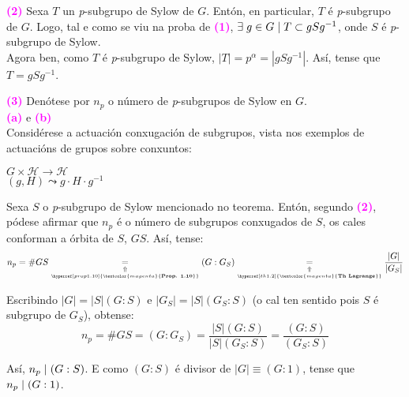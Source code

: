 \documentclass[twoside]{report}
\newcommand{\magbf}[1]{\textcolor{magenta}{\textbf{#1}}} %
\theoremstyle{mystyle}
\begin{document}
\vspace{5mm}

\noindent \magbf{(2)} Sexa $T$ un \textit{p}-subgrupo de Sylow de $G$. Entón, en particular, $T$ é \textit{p}-subgrupo de $G$. Logo, tal e como se viu na proba de \magbf{(1)}, $\exists \hspace{1mm} g \in G \hspace{1mm} | \hspace{1mm} T \subset gSg^{-1}$, onde $S$ é \textit{p}-subgrupo de Sylow.\\

\noindent Agora ben, como $T$ é \textit{p}-subgrupo de Sylow, $|T| = p^{\alpha} = |gSg^{-1}|$. Así, tense que $T = gSg^{-1}$.\\

\vspace{5mm}

\noindent \magbf{(3)} Denótese por $n_{p}$ o número de \textit{p}-subgrupos de Sylow en $G$.\\

\noindent \magbf{(a)} e \magbf{(b)}\\

\noindent Considérese a actuación conxugación de subgrupos, vista nos exemplos de actuacións de grupos sobre conxuntos:

    \begin{center}
    $G \times \mathscr{H} \longrightarrow \mathscr{H}$ \\
    \vspace{2mm}
    \hspace{8mm} $(g,H) \leadsto g \cdot H \cdot g^{-1}$
    \end{center}  
    
\noindent Sexa $S$ o \textit{p}-subgrupo de Sylow mencionado no teorema. Entón, segundo \magbf{(2)}, pódese afirmar que $n_{p}$ é o número de subgrupos conxugados de $S$, os cales conforman a órbita de $S$, $GS$. Así, tense:
$$n_{p} = \#GS \underset{\underset{\hyperref[prop1.10]{\magbf{Prop. 1.10}}}{\Uparrow}}{=} (G:G_{S}) \underset{\underset{\hyperref[th1.2]{\magbf{Th Lagrange}}}{\Uparrow}}{=} \displaystyle \frac{|G|}{|G_{S}|}$$

\noindent Escribindo $|G| = |S|(G:S)$ e $|G_{S}| = |S|(G_{S}:S)$ (o cal ten sentido pois $S$ é subgrupo de $G_{S}$), obtense:
$$n_{p} = \#GS = (G:G_{S}) = \displaystyle \frac{|S|(G:S)}{|S|(G_{S}:S)} = \displaystyle \frac{(G:S)}{(G_{S}:S)}$$

\noindent Así, $n_{p} \hspace{1mm} | \hspace{1mm} (G:S)$. E como $(G:S)$ é divisor de $|G| \equiv (G:1)$, tense que $n_{p} \hspace{1mm} | \hspace{1mm} (G:1)$.\\
\end{document}
